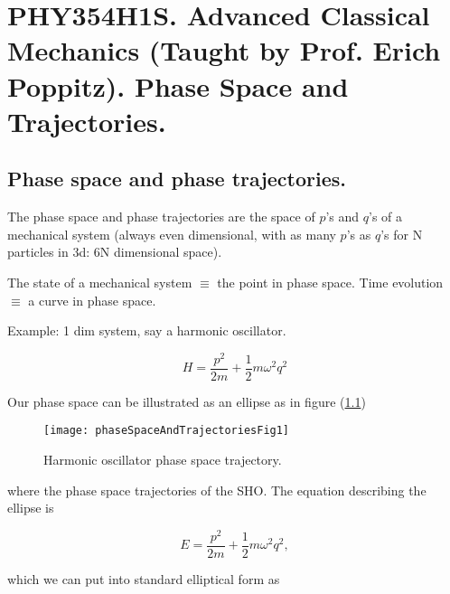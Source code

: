 
%

\chapter{PHY354H1S.  Advanced Classical Mechanics (Taught by Prof. Erich Poppitz).  Phase Space and Trajectories.}
\label{chap:phaseSpaceAndTrajectories}
{}
\date{Feb 29, 2012}

\beginArtWithToc

\section{Phase space and phase trajectories.}

The phase space and phase trajectories are the space of $p$'s and $q$'s of a mechanical system (always even dimensional, with as many $p$'s as $q$'s for N particles in 3d: 6N dimensional space).

The state of a mechanical system $\equiv$ the point in phase space.
Time evolution $\equiv$ a curve in phase space.

Example: 1 dim system, say a harmonic oscillator.

\begin{equation}\label{eqn:phaseSpaceAndTrajectories:10}
H = \frac{p^2}{2m} + \frac{1}{2} m \omega^2 q^2
\end{equation}

Our phase space can be illustrated as an ellipse as in figure (\ref{fig:phaseSpaceAndTrajectories:phaseSpaceAndTrajectoriesFig1})
\begin{figure}[htp]
   \centering
   \texttt{[image: phaseSpaceAndTrajectoriesFig1]}
   \caption{Harmonic oscillator phase space trajectory.}\label{fig:phaseSpaceAndTrajectories:phaseSpaceAndTrajectoriesFig1}
\end{figure}

where the phase space trajectories of the SHO.  The equation describing the ellipse is

\begin{equation}\label{eqn:phaseSpaceAndTrajectories:30}
E = \frac{p^2}{2m} + \frac{1}{2} m \omega^2 q^2,
\end{equation}

which we can put into standard elliptical form as

